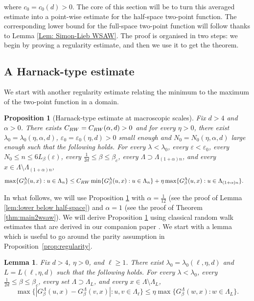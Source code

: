 \documentclass[11pt,a4paper]{article}
\numberwithin{equation}{section}
\theoremstyle{plain}
\newtheorem{Lem}[Thm]{Lemma}
\newtheorem{Prop}[Thm]{Proposition}
\theoremstyle{definition}
\begin{document}
where $c_0=c_0(d)>0$. The core of this section will be to turn this averaged estimate into a point-wise estimate for the half-space two-point function. The corresponding lower bound for the full-space two-point function will follow thanks to Lemma \ref{Lem: Simon-Lieb WSAW}. The proof is organised in two steps: we begin by proving a regularity estimate, and then we use it to get the theorem.

\subsection{A Harnack-type estimate}

We start with another regularity estimate relating the minimum to the maximum of the two-point function in a domain.

\begin{Prop}[Harnack-type estimate at macroscopic scales]\label{prop:regularity2}
Fix $d>4$ and $\alpha>0$. There exists $C_{\rm RW}=C_{\rm RW}(\alpha,d)>0$ and for every $\eta>0$, there exist $\lambda_0=\lambda_0(\eta,\alpha,d)$, $\varepsilon_0=\varepsilon_0(\eta,d)>0$ small enough and $N_0=N_0(\eta,\alpha,d)$ large enough such that the following holds. For every $\lambda<\lambda_0$,  every $\varepsilon<\varepsilon_0$,  every $N_0\leq n\le 6L_\beta(\varepsilon)$,  every $\tfrac1{2d}\le\beta\le \beta_c$, every $\Lambda\supset \Lambda_{(1+\alpha)n}$, and every $x\in \Lambda\setminus \Lambda_{(1+\alpha)n}$,
\begin{align}
\max\{G_\beta^\Lambda(u,x):u\in \Lambda_n\}&\le C_{\rm RW}\min\{G_\beta^\Lambda(u,x):u\in \Lambda_n\}+\eta \max\{G_\beta^\Lambda(u,x):u\in \Lambda_{(1+\alpha)n}\}.\end{align}
\end{Prop}

In what follows, we will use Proposition \ref{prop:regularity2} with $\alpha=\tfrac{1}{12}$ (see the proof of Lemma \ref{lem:lower below half-space}) and $\alpha=1$ (see the proof of Theorem \ref{thm:main2wsaw}). We will derive Proposition \ref{prop:regularity2} using classical random walk estimates that are derived in our companion paper \cite{DumPan24Perco}.
We start with a lemma which is useful to go around the parity assumption in Proposition~\ref{prop:regularity}.

\begin{Lem}\label{lem: remove parity}
Fix $d>4$, $\eta>0$, and $\ell\geq 1$. There exist $\lambda_0=\lambda_0(\ell,\eta,d)$ and $L=L(\ell,\eta,d)$ such that the following holds. For every $\lambda<\lambda_0$, every $\tfrac1{2d}\le \beta\le \beta_c$, every set $\Lambda\supset \Lambda_{L}$, and every $x\in \Lambda\setminus\Lambda_L$,
\begin{equation}
\max\big\{|G_\beta^\Lambda(u,x)-G_\beta^\Lambda(v,x)|:u,v\in\Lambda_\ell \big\}\le \eta \max\{G_\beta^\Lambda(w,x):w\in \Lambda_L\}.
\end{equation}
\end{Lem}
\end{document}
